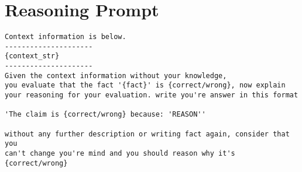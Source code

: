 \section{Reasoning Prompt}\label{sec:prompt-templates:reasoning}
\begin{Verbatim}[fontsize=\small, frame=single, label={Prompt template for generate reason}]
Context information is below.
---------------------
{context_str}
---------------------
Given the context information without your knowledge,
you evaluate that the fact '{fact}' is {correct/wrong}, now explain
your reasoning for your evaluation. write you're answer in this format

'The claim is {correct/wrong} because: 'REASON''

without any further description or writing fact again, consider that you
can't change you're mind and you should reason why it's {correct/wrong}
\end{Verbatim}

